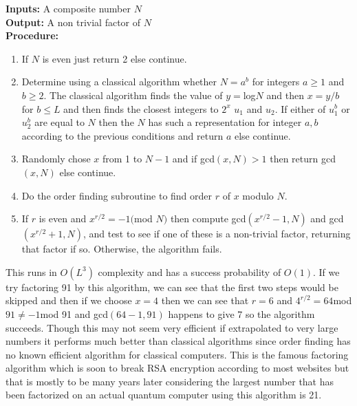 \documentclass{report}
\begin{document}
\textbf{Inputs: }A composite number $N$\\
\textbf{Output: }A non trivial factor of $N$\\
\textbf{Procedure:}
\begin{enumerate}
    \item If $N$ is even just return 2 else continue.
    \item Determine using a classical algorithm whether $N = a^b$ for integers $a \geq 1$ and $b \geq 2$. The classical algorithm finds the value of $y = $log$N$ and then $x = y/b$ for $b \leq L$ and then finds the closest integers to $2^x$ $u_1$ and $u_2$. If either of $u_1^b$ or $u_2^b$ are equal to $N$ then the $N$ has such a representation for integer $a,b$ according to the previous conditions and return $a$ else continue.
    \item Randomly chose $x$ from 1 to $N-1$ and if gcd$(x,N) > 1$ then return gcd$(x,N)$ else continue.
    \item Do the order finding subroutine to find order $r$ of $x$ modulo $N$. \item If $r$ is even and $x^{r/2} = -1($mod $N)$ then compute gcd$(x^{r/2} - 1,N)$ and gcd$(x^{r/2} + 1,N)$, and test to see if one of these is a non-trivial factor, returning that factor if so. Otherwise, the algorithm fails.
\end{enumerate}
This runs in $O(L^3)$ complexity and has a success probability of $O(1)$.
If we try factoring 91 by this algorithm, we can see that the first two steps would be skipped and then if we choose $x = 4$ then we can see that $r = 6$ and $4^{r/2} = 64$mod $91 \neq -1$mod 91 and gcd$(64 - 1,91)$ happens to give 7 so the algorithm succeeds. Though this may not seem very efficient if extrapolated to very large numbers it performs much better than classical algorithms since order finding has no known efficient algorithm for classical computers. This is the famous factoring algorithm which is soon to break RSA encryption according to most websites but that is mostly to be many years later considering the largest number that has been factorized on an actual quantum computer using this algorithm is 21.
\end{document}
